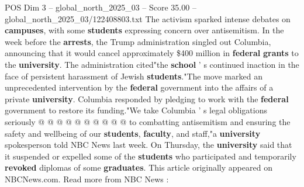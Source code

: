 \begin{textsample}{POS Dim 3 – global\_north\_2025\_03 – Score 35.00 – global\_north\_2025\_03/122408803.txt}
The activism sparked intense debates on \textbf{campuses}, with some \textbf{students} expressing concern over antisemitism.
In the week before the \textbf{arrests}, the Trump administration singled out Columbia, announcing that it would cancel approximately \$400 million in \textbf{federal} \textbf{grants} to the \textbf{university}.
The administration cited"the \textbf{school} ' s continued inaction in the face of persistent harassment of Jewish \textbf{students}."The move marked an unprecedented intervention by the \textbf{federal} government into the affairs of a private \textbf{university}.
Columbia responded by pledging to work with the \textbf{federal} government to restore its funding."We take Columbia ' s legal obligations seriously @ @ @ @ @ @ @ @ @ @ to combatting antisemitism and ensuring the safety and wellbeing of our \textbf{students}, \textbf{faculty}, and staff,"a \textbf{university} spokesperson told NBC News last week.
On Thursday, the \textbf{university} said that it suspended or expelled some of the \textbf{students} who participated and temporarily \textbf{revoked} diplomas of some \textbf{graduates}.
This article originally appeared on NBCNews.com.
Read more from NBC News :

\end{textsample}
